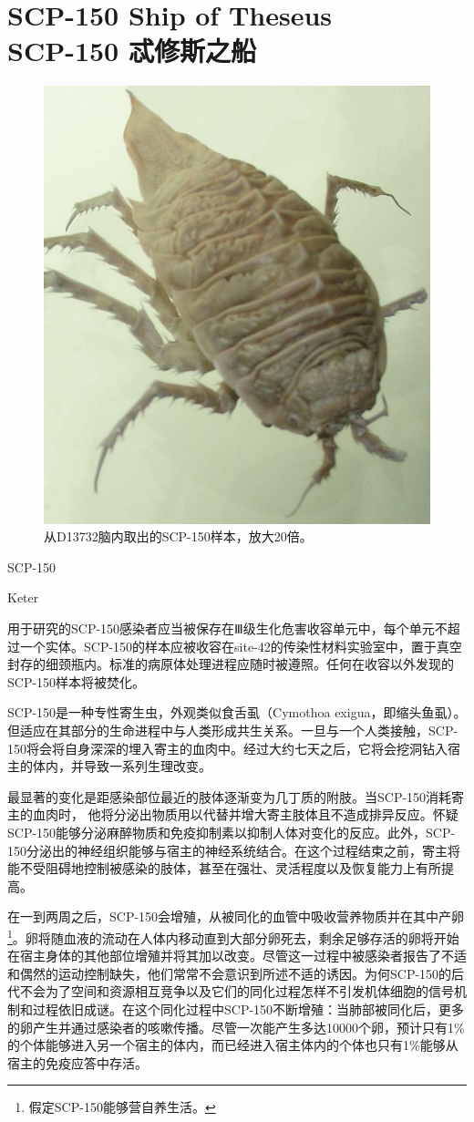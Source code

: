 \chapter[SCP-150 忒修斯之船]{
    SCP-150 Ship of Theseus\\
    SCP-150 忒修斯之船
}

\label{chap:SCP-150}

\begin{figure}[H]
    \centering
    \includegraphics[width=0.5\linewidth]{images/SCP-150.jpg}
    \caption*{从D13732脑内取出的SCP-150样本，放大20倍。}
\end{figure}

SCP-150

Keter

用于研究的SCP-150感染者应当被保存在Ⅲ级生化危害收容单元中，每个单元不超过一个实体。SCP-150的样本应被收容在site-42的传染性材料实验室中，置于真空封存的细颈瓶内。标准的病原体处理进程应随时被遵照。任何在收容以外发现的SCP-150样本将被焚化。

SCP-150是一种专性寄生虫，外观类似食舌虱（Cymothoa exigua，即缩头鱼虱）。但适应在其部分的生命进程中与人类形成共生关系。一旦与一个人类接触，SCP-150将会将自身深深的埋入寄主的血肉中。经过大约七天之后，它将会挖洞钻入宿主的体内，并导致一系列生理改变。

最显著的变化是距感染部位最近的肢体逐渐变为几丁质的附肢。当SCP-150消耗寄主的血肉时， 他将分泌出物质用以代替并增大寄主肢体且不造成排异反应。怀疑SCP-150能够分泌麻醉物质和免疫抑制素以抑制人体对变化的反应。此外，SCP-150分泌出的神经组织能够与宿主的神经系统结合。在这个过程结束之前，寄主将能不受阻碍地控制被感染的肢体，甚至在强壮、灵活程度以及恢复能力上有所提高。

在一到两周之后，SCP-150会增殖，从被同化的血管中吸收营养物质并在其中产卵\footnote{假定SCP-150能够营自养生活。}。卵将随血液的流动在人体内移动直到大部分卵死去，剩余足够存活的卵将开始在宿主身体的其他部位增殖并将其加以改变。尽管这一过程中被感染者报告了不适和偶然的运动控制缺失，他们常常不会意识到所述不适的诱因。为何SCP-150的后代不会为了空间和资源相互竞争以及它们的同化过程怎样不引发机体细胞的信号机制和过程依旧成谜。在这个同化过程中SCP-150不断增殖：当肺部被同化后，更多的卵产生并通过感染者的咳嗽传播。尽管一次能产生多达10000个卵，预计只有1\%的个体能够进入另一个宿主的体内，而已经进入宿主体内的个体也只有1\%能够从宿主的免疫应答中存活。

